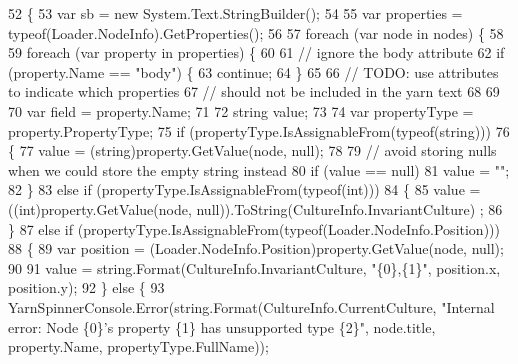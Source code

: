 \begin{DoxyCode}
52         \{
53             var sb = \textcolor{keyword}{new} System.Text.StringBuilder();
54 
55             var properties = typeof(Loader.NodeInfo).GetProperties();
56 
57             \textcolor{keywordflow}{foreach} (var node \textcolor{keywordflow}{in} nodes) \{
58 
59                 \textcolor{keywordflow}{foreach} (var property \textcolor{keywordflow}{in} properties) \{
60 
61                     \textcolor{comment}{// ignore the body attribute}
62                     \textcolor{keywordflow}{if} (property.Name == \textcolor{stringliteral}{"body"}) \{
63                         \textcolor{keywordflow}{continue};
64                     \}
65 
66                     \textcolor{comment}{// TODO: use attributes to indicate which properties}
67                     \textcolor{comment}{// should not be included in the yarn text}
68 
69 
70                     var field = property.Name;
71 
72                     \textcolor{keywordtype}{string} value;
73 
74                     var propertyType = property.PropertyType;
75                     \textcolor{keywordflow}{if} (propertyType.IsAssignableFrom(typeof(\textcolor{keywordtype}{string})))
76                     \{
77                         value = (string)property.GetValue(node, null);
78 
79                         \textcolor{comment}{// avoid storing nulls when we could store the empty string instead}
80                         \textcolor{keywordflow}{if} (value == null)
81                             value = \textcolor{stringliteral}{""};
82                     \}
83                     \textcolor{keywordflow}{else} \textcolor{keywordflow}{if} (propertyType.IsAssignableFrom(typeof(\textcolor{keywordtype}{int})))
84                     \{
85                         value = ((int)property.GetValue(node, null)).ToString(CultureInfo.InvariantCulture)
      ;
86                     \}
87                     \textcolor{keywordflow}{else} \textcolor{keywordflow}{if} (propertyType.IsAssignableFrom(typeof(Loader.NodeInfo.Position)))
88                     \{
89                         var position = (Loader.NodeInfo.Position)property.GetValue(node, null);
90 
91                         value = string.Format(CultureInfo.InvariantCulture, \textcolor{stringliteral}{"\{0\},\{1\}"}, position.x, 
      position.y);
92                     \} \textcolor{keywordflow}{else} \{
93                         YarnSpinnerConsole.Error(string.Format(CultureInfo.CurrentCulture, \textcolor{stringliteral}{"Internal error:
       Node \{0\}'s property \{1\} has unsupported type \{2\}"}, node.title, property.Name, propertyType.FullName));

\end{DoxyCode}
